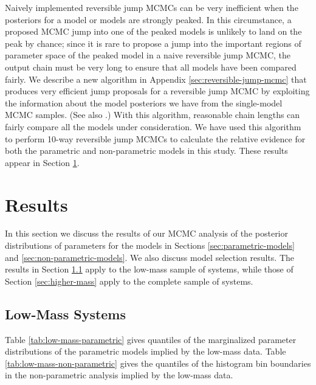 \documentclass[preprint]{aastex}
\begin{document}
Naively implemented reversible jump MCMCs can be very inefficient when
the posteriors for a model or models are strongly peaked.  In this
circumstance, a proposed MCMC jump into one of the peaked models is
unlikely to land on the peak by chance; since it is rare to propose a
jump into the important regions of parameter space of the peaked model
in a naive reversible jump MCMC, the output chain must be very long to
ensure that all models have been compared fairly.  We describe a new
algorithm in Appendix \ref{sec:reversible-jump-mcmc} that produces
very efficient jump proposals for a reversible jump MCMC by exploiting
the information about the model posteriors we have from the
single-model MCMC samples.  (See also \citet{Farr2010}.)  With this
algorithm, reasonable chain lengths can fairly compare all the models
under consideration.  We have used this algorithm to perform 10-way
reversible jump MCMCs to calculate the relative evidence for both the
parametric and non-parametric models in this study.  These results
appear in Section \ref{sec:results}.

\section{Results}
\label{sec:results}

In this section we discuss the results of our MCMC analysis of the
posterior distributions of parameters for the models in Sections
\ref{sec:parametric-models} and \ref{sec:non-parametric-models}.  We
also discuss model selection results.  The results in Section
\ref{sec:results-low-mass} apply to the low-mass sample of
systems, while those of Section \ref{sec:higher-mass} apply to the
complete sample of systems.

\subsection{Low-Mass Systems}
\label{sec:results-low-mass}

Table \ref{tab:low-mass-parametric} gives quantiles of the
marginalized parameter distributions of the parametric models implied
by the low-mass data.  Table \ref{tab:low-mass-non-parametric} gives
the quantiles of the histogram bin boundaries in the non-parametric
analysis implied by the low-mass data.
\end{document}
